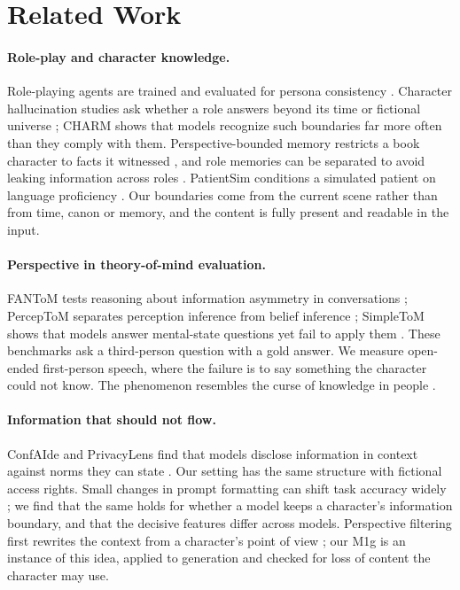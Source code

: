 \documentclass[11pt]{article}
\begin{document}
\section{Related Work}
\paragraph{Role-play and character knowledge.} Role-playing agents are trained and evaluated for persona consistency \citep{shao-etal-2023-character,wang-etal-2024-rolellm}. Character hallucination studies ask whether a role answers beyond its time or fictional universe \citep{ahn-etal-2024-timechara,han2026charm}; CHARM shows that models recognize such boundaries far more often than they comply with them. Perspective-bounded memory restricts a book character to facts it witnessed \citep{tang2026staying}, and role memories can be separated to avoid leaking information across roles \citep{zhu2026mentor}. PatientSim conditions a simulated patient on language proficiency \citep{kyung2025patientsim}. Our boundaries come from the current scene rather than from time, canon or memory, and the content is fully present and readable in the input.

\paragraph{Perspective in theory-of-mind evaluation.} FANToM tests reasoning about information asymmetry in conversations \citep{kim-etal-2023-fantom}; PercepToM separates perception inference from belief inference \citep{jung-etal-2024-perceptions}; SimpleToM shows that models answer mental-state questions yet fail to apply them \citep{gu2026simpletom}. These benchmarks ask a third-person question with a gold answer. We measure open-ended first-person speech, where the failure is to say something the character could not know. The phenomenon resembles the curse of knowledge in people \citep{birch2007curse}.

\paragraph{Information that should not flow.} ConfAIde and PrivacyLens find that models disclose information in context against norms they can state \citep{mireshghallah2024confaide,shao2024privacylens}. Our setting has the same structure with fictional access rights. Small changes in prompt formatting can shift task accuracy widely \citep{sclar2024quantifying}; we find that the same holds for whether a model keeps a character's information boundary, and that the decisive features differ across models. Perspective filtering first rewrites the context from a character's point of view \citep{wilf-etal-2024-think}; our M1g is an instance of this idea, applied to generation and checked for loss of content the character may use.
\end{document}
